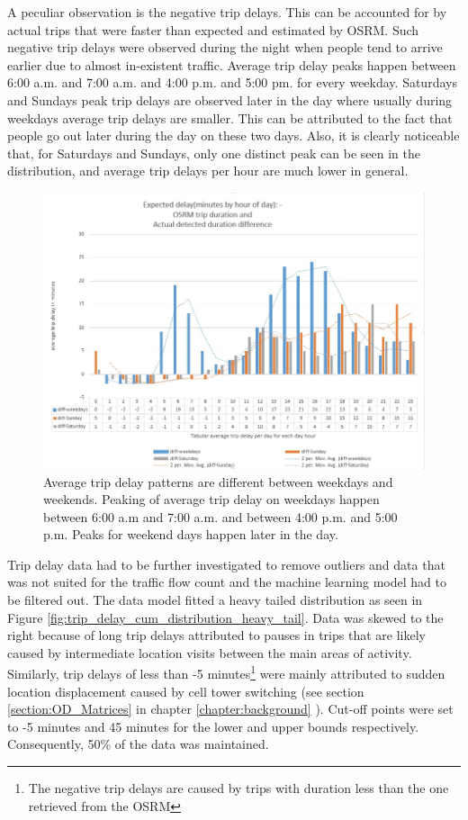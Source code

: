 \documentclass[12pt, a4paper]{report}
\theoremstyle{definition}
\theoremstyle{definition}%
\theoremstyle{definition}%
\theoremstyle{definition}%
\theoremstyle{definition}%
\theoremstyle{definition}%
\begin{document}
A peculiar observation is the negative trip delays. This can be accounted for by actual trips that were faster than expected and estimated by OSRM. Such negative trip delays were observed during the night when people tend to arrive earlier due to almost in-existent traffic. Average trip delay peaks happen between 6:00 a.m. and 7:00 a.m. and 4:00 p.m. and 5:00 pm. for every weekday. Saturdays and Sundays peak trip delays are observed later in the day where usually during weekdays average trip delays are smaller. This can be attributed to the fact that people go out later during the day on these two days. Also, it is clearly noticeable that, for Saturdays and Sundays, only one distinct peak can be seen in the distribution, and average trip delays per hour are much lower in general.

\begin{figure}[h]	
	\includegraphics[scale=0.65]{Trip_delay.jpg}
	\centering
	\caption[Hourly average trip delay weekdays vs weekends]{Average trip delay patterns are different between weekdays and weekends. Peaking of average trip delay on weekdays happen between 6:00 a.m and 7:00 a.m. and between 4:00 p.m. and 5:00 p.m. Peaks for weekend days happen later in the day.}
	\label{fig:trip_delay_weekdays_vs_weekends}
\end{figure}

Trip delay data had to be further investigated to remove outliers and data that was not suited for the traffic flow count and the machine learning model had to be filtered out. The data model fitted a heavy tailed distribution as seen in Figure \ref{fig:trip_delay_cum_distribution_heavy_tail}. Data was skewed to the right because of long trip delays attributed to pauses in trips that are likely caused by intermediate location visits between the main areas of activity. Similarly, trip delays of less than -5 minutes\footnote{The negative trip delays are caused by trips with duration less than the one retrieved from the OSRM} were mainly attributed to sudden location displacement caused by cell tower switching (see section \ref{section:OD_Matrices} in chapter \ref{chapter:background} ). Cut-off points were set to -5 minutes and 45 minutes for the lower and upper bounds respectively. Consequently, 50\% of the data was maintained.  
\end{document}
